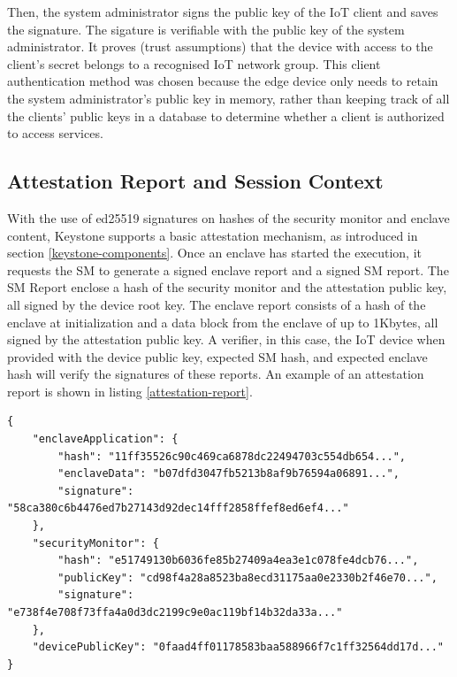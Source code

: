 Then, the system administrator signs the public key of the IoT client and saves the signature. The sigature is verifiable with the public key of the system administrator. It proves (trust assumptions) that the device with access to the client's secret belongs to a recognised IoT network group. This client authentication method was chosen because the edge device only needs to retain the system administrator's public key in memory, rather than keeping track of all the clients' public keys in a database to determine whether a client is authorized to access services.

\subsection{Attestation Report and Session Context}
With the use of ed25519 signatures on hashes of the security monitor and enclave content, Keystone supports a basic attestation mechanism, as introduced in section \ref{keystone-components}. Once an enclave has started the execution, it requests the SM to generate a signed enclave report and a signed SM report. The SM Report enclose a hash of the security monitor and the attestation public key, all signed by the device root key. The enclave report consists of a hash of the enclave at initialization and a data block from the enclave of up to 1Kbytes, 
all signed by the attestation public key. A verifier, in this case, the IoT device when provided with the device public key, expected SM hash, and expected enclave hash will verify the signatures of these reports. An example of an attestation report is shown in listing \ref{attestation-report}. \\

\begin{lstlisting}[caption={Example of a attestation report  generated by the enclave},captionpos=b,style=json, label={attestation-report},frame=single]
{
    "enclaveApplication": {
        "hash": "11ff35526c90c469ca6878dc22494703c554db654...",
        "enclaveData": "b07dfd3047fb5213b8af9b76594a06891...",
        "signature": "58ca380c6b4476ed7b27143d92dec14fff2858ffef8ed6ef4..."
    },
    "securityMonitor": {
        "hash": "e51749130b6036fe85b27409a4ea3e1c078fe4dcb76...",
        "publicKey": "cd98f4a28a8523ba8ecd31175aa0e2330b2f46e70...",
        "signature": "e738f4e708f73ffa4a0d3dc2199c9e0ac119bf14b32da33a..."
    },
    "devicePublicKey": "0faad4ff01178583baa588966f7c1ff32564dd17d..."
}
\end{lstlisting}

